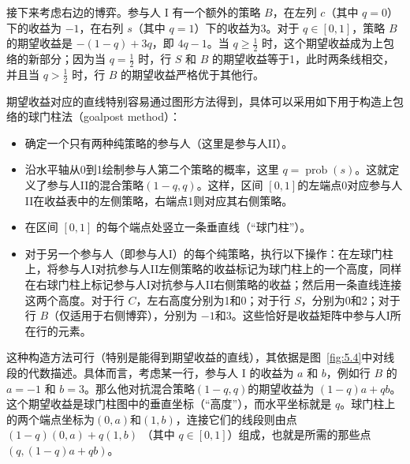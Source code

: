 接下来考虑右边的博弈。参与人 I 有一个额外的策略 \(B\)，在左列 \(c\)（其中 \(q = 0\)）下的收益为 $-1$，在右列 \(s\)（其中 \(q = 1\)）下的收益为$3$。对于 \(q \in  [0,1]\)，策略 \(B\)的期望收益是 \(- \left( {1 - q}\right)  + {3q}\)，即 \({4q} - 1\)。当 \(q \geq  \frac{1}{2}\) 时，这个期望收益成为上包络的新部分；因为当 \(q = \frac{1}{2}\) 时，行 \(S\) 和 \(B\) 的期望收益等于1，此时两条线相交，并且当 \(q > \frac{1}{2}\) 时，行 \(B\) 的期望收益严格优于其他行。

期望收益对应的直线特别容易通过图形方法得到，具体可以采用如下用于构造上包络的球门柱法（goalpost method）：

\begin{itemize}
\item 确定一个只有两种纯策略的参与人（这里是参与人II）。

\item 沿水平轴从0到1绘制参与人第二个策略的概率，这里 \(q = \operatorname{prob}\left( s\right)\)。这就定义了参与人II的混合策略$(1 - q, q)$。这样，区间 \(\left\lbrack  {0,1}\right\rbrack\)的左端点0对应参与人II在收益表中的左侧策略，右端点1则对应其右侧策略。

\item 在区间 \(\left\lbrack  {0,1}\right\rbrack\) 的每个端点处竖立一条垂直线（“球门柱”）。

\item 对于另一个参与人（即参与人I）的每个纯策略，执行以下操作：在左球门柱上，将参与人I对抗参与人II左侧策略的收益标记为球门柱上的一个高度，同样在右球门柱上标记参与人I对抗参与人II右侧策略的收益；然后用一条直线连接这两个高度。对于行 \(C\)，左右高度分别为1和0；对于行 \(S\)，分别为0和2；对于行 \(B\)（仅适用于右侧博弈），分别为 $-1$和$3$。这些恰好是收益矩阵中参与人I所在行的元素。
\end{itemize}


这种构造方法可行（特别是能得到期望收益的直线），其依据是图~\ref{fig:5.4}中对线段的代数描述。具体而言，考虑某一行，参与人 \(\mathrm{I}\) 的收益为 \(a\) 和 \(b\)，例如行 \(B\) 的 \(a =  - 1\) 和 \(b = 3\)。那么他对抗混合策略$(1 - q, q)$的期望收益为 \(\left( {1 - q}\right) a + {qb}\)。这个期望收益是球门柱图中的垂直坐标（“高度”），而水平坐标就是 \(q\)。球门柱上的两个端点坐标为$(0, a)$和$(1, b)$，连接它们的线段则由点 \(\left( {1 - q}\right) \left( {0,a}\right)  + q\left( {1,b}\right)\) （其中 \(q \in  \left\lbrack  {0,1}\right\rbrack\)）组成，也就是所需的那些点 \(\left( {q,\left( {1 - q}\right) a + {qb}}\right)\)。

